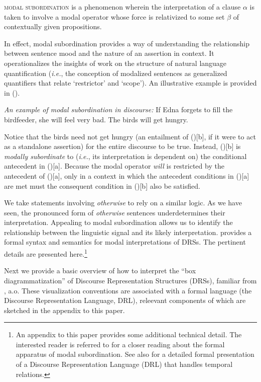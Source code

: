 \pex \label{modsub-def}\textsc{modal subordination} is a phenomenon wherein the interpretation of a clause $ \alpha $ is taken to involve a modal operator whose force is relativized to some set $ \beta $ of contextually given propositions.\hfill\citep[718]{Roberts1989}\xe


In effect, modal subordination provides a way of understanding the relationship between sentence mood and the nature of an assertion in context. It operationalizes the insights of work on the structure of natural language quantification (\textit{i.e.}, the conception of modalized sentences as generalized quantifiers that relate `restrictor' and `scope'). An illustrative example is provided in (\nextx).

\pex  \label{birds} \textit{An example of modal subordination in discourse:}
\a  If Edna forgets to fill the birdfeeder, she will feel very bad.
\a  The birds will get hungry.\hfill\citep[683]{Roberts1989}\xe

Notice that the birds need not get hungry (an entailment of (\lastx)[b], if it were to act as a standalone assertion) for the entire discourse to be true. Instead, (\lastx)[b] is \textit{modally subordinate} to (\textit{i.e.}, its interpretation is dependent on) the conditional antecedent in (\lastx)[a]. 
Because the modal operator \textit{will} is restricted by the antecedent of (\lastx)[a], only in a context in which the antecedent conditions in (\lastx)[a] are met must the consequent condition in (\lastx)[b] also be satisfied.

We take statements involving \textit{otherwise} to rely on a similar logic. As we have seen, the pronounced form of \textit{otherwise} sentences underdetermines their interpretation. Appealing to {modal subordination} allows us to identify the relationship between the linguistic signal and its likely interpretation.  \citet[712--5]{Roberts1989} provides a formal syntax and semantics for modal interpretations of DRSs. The pertinent details are presented here.\footnote{An appendix to this paper provides some additional technical detail. The interested reader is referred to \citet{Roberts1989,Roberts1990} for a closer reading about the formal apparatus of modal subordination. See also \citet[47--58]{Kamp2017} for a detailed formal presentation of a Discourse Representation Language (DRL) that handles temporal relations.}


Next we provide a basic overview of how to interpret the ``box diagrammatization'' of Discourse Representation Structures (DRSs), familiar from \citealt{Roberts1989,Roberts1990, Kamp1981, Partee}, a.o. These visualization conventions are associated with a formal language (the Discourse Representation Language, DRL), releevant components of which are sketched in the appendix to this paper.

